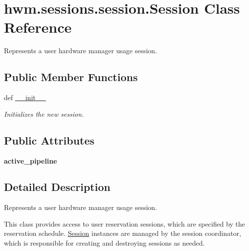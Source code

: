 \hypertarget{classhwm_1_1sessions_1_1session_1_1_session}{\section{hwm.\-sessions.\-session.\-Session Class Reference}
\label{classhwm_1_1sessions_1_1session_1_1_session}
}


Represents a user hardware manager usage session.  


\subsection*{Public Member Functions}
\begin{DoxyCompactItemize}
\item 
def \hyperlink{classhwm_1_1sessions_1_1session_1_1_session_afe7c8702e8502c36cd300226e81121c6}{\-\_\-\-\_\-init\-\_\-\-\_\-}
\begin{DoxyCompactList}\small\item\em Initializes the new session. \end{DoxyCompactList}\end{DoxyCompactItemize}
\subsection*{Public Attributes}
\begin{DoxyCompactItemize}
\item 
\hypertarget{classhwm_1_1sessions_1_1session_1_1_session_af2f0c6b61f2309847f20f96920dea75e}{{\bfseries active\-\_\-pipeline}}\label{classhwm_1_1sessions_1_1session_1_1_session_af2f0c6b61f2309847f20f96920dea75e}

\end{DoxyCompactItemize}


\subsection{Detailed Description}
Represents a user hardware manager usage session. 

This class provides access to user reservation sessions, which are specified by the reservation schedule. \hyperlink{classhwm_1_1sessions_1_1session_1_1_session}{Session} instances are managed by the session coordinator, which is responsible for creating and destroying sessions as needed. 

